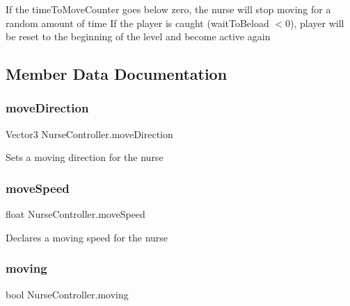 If the time\+To\+Move\+Counter goes below zero, the nurse will stop moving for a random amount of time If the player is caught (wait\+To\+Beload $<$0), player will be reset to the beginning of the level and become active again 



\subsection{Member Data Documentation}
\mbox{\label{class_nurse_controller_af1bbb9415d5e5fc25461cff6f72722f3}} 
\subsubsection{\texorpdfstring{move\+Direction}{moveDirection}}
{\footnotesize\ttfamily Vector3 Nurse\+Controller.\+move\+Direction\hspace{0.3cm}{\ttfamily [private]}}



Sets a moving direction for the nurse 

\mbox{\label{class_nurse_controller_ac322ce98930aa447581ed2f996afa236}} 
\subsubsection{\texorpdfstring{move\+Speed}{moveSpeed}}
{\footnotesize\ttfamily float Nurse\+Controller.\+move\+Speed}



Declares a moving speed for the nurse 

\mbox{\label{class_nurse_controller_a51594c8ff5d4c71eeec6aef9fff4819c}} 
\subsubsection{\texorpdfstring{moving}{moving}}
{\footnotesize\ttfamily bool Nurse\+Controller.\+moving\hspace{0.3cm}{\ttfamily [private]}}



